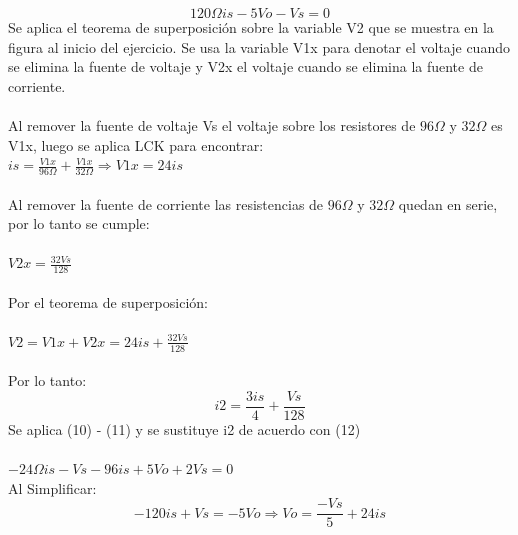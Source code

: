 \documentclass{article}
\begin{document}
\begin{equation}
    {120\Omega}is - 5Vo - Vs = 0
\end{equation}
Se aplica el teorema de superposición sobre la variable V2 que se muestra en la figura al inicio del ejercicio. Se usa la variable V1x para denotar el voltaje cuando se elimina la fuente de voltaje y V2x el voltaje cuando se elimina la fuente de corriente.\\  \\
Al remover la fuente de voltaje Vs el voltaje sobre los resistores de ${96\Omega}$ y ${32\Omega}$  es V1x, luego se aplica LCK para encontrar:\\
$is =\frac{V1x}{{96\Omega}} + \frac{V1x}{{32\Omega}} \Rightarrow   V1x = 24is$\\ \\
Al remover la fuente de corriente las resistencias de ${96\Omega}$ y ${32\Omega}$ quedan en serie, por lo tanto se cumple: \\ \\
$V2x = \frac{32Vs}{128} $\\ \\
Por el teorema de superposición: \\ \\
$V2 = V1x + V2x = 24is + \frac{32Vs}{128}$ \\ \\
Por lo tanto: \\ 
\begin{equation}
    i2 = \frac{3is}{4} + \frac{Vs}{128}
\end{equation}
Se aplica (10) -  (11) y se sustituye i2 de acuerdo con (12) \\ \\
$    {-24\Omega}is -Vs - 96is + 5Vo + 2Vs = 0$ \\
Al Simplificar:\\
\begin{equation}
    -120is  +Vs = -5Vo \Rightarrow  Vo = \frac{-Vs}{5} +24is
\end{equation}
\end{document}
